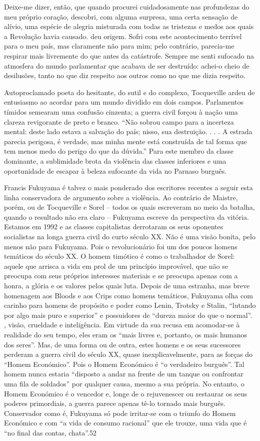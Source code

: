  \par 
Deixe-me dizer, então, que quando procurei cuidadosamente nas profundezas do meu próprio coração, descobri, com alguma surpresa, uma certa sensação de alívio, uma espécie de alegria misturada com todas as tristezas e medos aos quais a Revolução havia causado. deu origem. Sofri com este acontecimento terrível para o meu país, mas claramente não para mim; pelo contrário, parecia-me respirar mais livremente do que antes da catástrofe. Sempre me senti sufocado na atmosfera do mundo parlamentar que acabava de ser destruído: achei-o cheio de desilusões, tanto no que diz respeito aos outros como no que me dizia respeito.
 \par 
Autoproclamado poeta do hesitante, do sutil e do complexo, Tocqueville ardeu de entusiasmo ao acordar para um mundo dividido em dois campos. Parlamentos tímidos semearam uma confusão cinzenta; a guerra civil forçou à nação uma clareza revigorante de preto e branco. “Não sobrou campo para a incerteza mental: deste lado estava a salvação do país; nisso, sua destruição. . . . A estrada parecia perigosa, é verdade, mas minha mente está construída de tal forma que tem menos medo do perigo do que da dúvida.” Para este membro da classe dominante, a sublimidade brota da violência das classes inferiores e uma oportunidade de escapar à beleza sufocante da vida no Parnaso burguês.
 \par 
Francis Fukuyama é talvez o mais ponderado dos escritores recentes a seguir esta linha conservadora de argumento sobre a violência. Ao contrário de Maistre, porém, ou de Tocqueville e Sorel – todos os quais escreveram no meio da batalha, quando o resultado não era claro – Fukuyama escreve da perspectiva da vitória. Estamos em 1992 e as classes capitalistas derrotaram os seus oponentes socialistas na longa guerra civil do curto século XX. Não é uma visão bonita, pelo menos não para Fukuyama. Pois o revolucionário foi um dos poucos homens temáticos do século XX. O homem timótico é como o trabalhador de Sorel: aquele que arrisca a vida em prol de um princípio improvável, que não se preocupa com seus próprios interesses materiais e se preocupa apenas com a honra, a glória e os valores pelos quais luta. Depois de uma estranha, mas breve homenagem aos Bloods e aos Crips como homens temáticos, Fukuyama olha com carinho para homens de propósito e poder como Lenin, Trotsky e Stalin, “lutando por algo mais puro e superior” e possuidores de “dureza maior do que o normal”. , visão, crueldade e inteligência. Em virtude da sua recusa em acomodar-se à realidade do seu tempo, eles eram os “mais livres e, portanto, os mais humanos dos seres”. Mas, de uma forma ou de outra, estes homens e os seus sucessores perderam a guerra civil do século XX, quase inexplicavelmente, para as forças do “Homem Económico”. Pois o Homem Económico é “o verdadeiro burguês”. Tal homem nunca estaria “disposto a andar na frente de um tanque ou confrontar uma fila de soldados” por qualquer causa, mesmo a sua própria. No entanto, o Homem Económico é o vencedor e, longe de o rejuvenescer ou restaurar os seus poderes primordiais, a guerra parece apenas tê-lo tornado mais burguês. Conservador como é, Fukuyama só pode irritar-se com o triunfo do Homem Económico e com “a vida de consumo racional” que ele trouxe, uma vida que é “no final das contas, chata”.{\color{blue}52}

